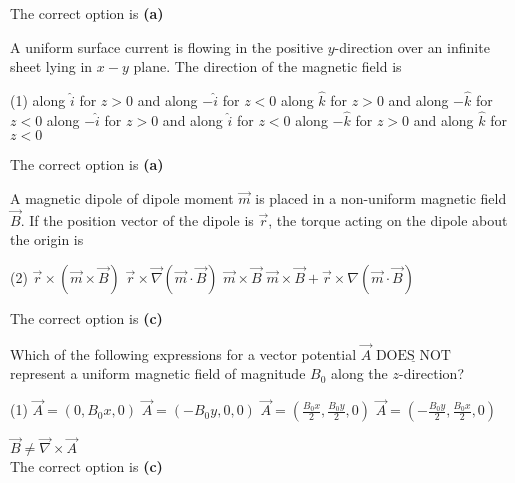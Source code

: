 \begin{enumerate}
\begin{answer}
		The correct option is \textbf{(a)}	
	\end{answer}
	\begin{minipage}{\textwidth}
		\item A uniform surface current is flowing in the positive $y$-direction over an infinite sheet lying in $x-y$ plane. The direction of the magnetic field is
	\end{minipage}
	\begin{tasks}(1)
		\task[\textbf{A.}]along $\hat{i}$ for $z>0$ and along $-\hat{i}$ for $z<0$
		\task[\textbf{B.}]along $\hat{k}$ for $z>0$ and along $-\hat{k}$ for $z<0$
		\task[\textbf{C.}]along $-\hat{i}$ for $z>0$ and along $\hat{i}$ for $z<0$
		\task[\textbf{D.}]along $-\hat{k}$ for $z>0$ and along $\hat{k}$ for $z<0$
	\end{tasks}
	\begin{answer}
		The correct option is \textbf{(a)}
	\end{answer}
\begin{minipage}{\textwidth}
	\item A magnetic dipole of dipole moment $\vec{m}$ is placed in a non-uniform magnetic field $\vec{B} .$ If the position vector of the dipole is $\vec{r}$, the torque acting on the dipole about the origin is
\end{minipage}
\begin{tasks}(2)
	\task[\textbf{A.}] $\vec{r} \times(\vec{m} \times \vec{B})$
	\task[\textbf{B.}]$\vec{r} \times \vec{\nabla}(\vec{m} \cdot \vec{B})$
	\task[\textbf{C.}]$\vec{m} \times \vec{B}$
	\task[\textbf{D.}]$\vec{m} \times \vec{B}+\vec{r} \times \nabla(\vec{m} \cdot \vec{B})$
\end{tasks}
\begin{answer}
	The correct option is \textbf{(c)}
\end{answer}
	\begin{minipage}{\textwidth}
		\item Which of the following expressions for a vector potential $\vec{A} \underline{\text { DOES NOT }}$ represent a uniform magnetic field of magnitude $B_{0}$ along the $z$-direction?
	\end{minipage}
	\begin{tasks}(1)
		\task[\textbf{A.}] $\vec{A}=\left(0, B_{0} x, 0\right)$
		\task[\textbf{B.}]$\vec{A}=\left(-B_{0} y, 0,0\right)$
		\task[\textbf{C.}]$\vec{A}=\left(\frac{B_{0} x}{2}, \frac{B_{0} y}{2}, 0\right)$
		\task[\textbf{D.}] $\vec{A}=\left(-\frac{B_{0} y}{2}, \frac{B_{0} x}{2}, 0\right)$
	\end{tasks}
	\begin{answer}
		$\vec{B} \neq \vec{\nabla} \times \vec{A}$\\
		The correct option is \textbf{(c)}	
	\end{answer}
	

\end{enumerate}
